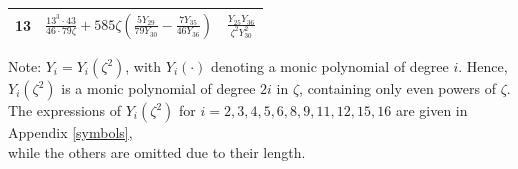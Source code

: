 \documentclass[11pt,a4paper]{article}
\numberwithin{equation}{section}
\begin{document}
\begin{table}[H]
\begin{tabular}{|c|c|c|}
13&$\frac{13^3\cdot43}{46\cdot79\zeta}+585\zeta\left(\frac{5Y_{29}}{79Y_{30}}-\frac{7Y_{35}}{46Y_{36}}\right)$&$\frac{Y_{25}Y_{36}}{\zeta^2Y_{30}^2}$\\\hline
\end{tabular}
\vspace{0.4em}
\par {\small Note: $Y_i=Y_i(\zeta^2)$, with $Y_i(\cdot)$ denoting a monic polynomial of degree $i$. Hence,\\ $Y_i(\zeta^2)$ is a monic polynomial of degree $2i$ in $\zeta$, containing only even powers of $\zeta$.\\ The expressions of $Y_i(\zeta^2)$ for $i=2,3,4,5,6,8,9,11,12,15,16$ are given in Appendix \ref{symbols},\\
while the others are omitted due to their length.}
\end{table}
\end{document}
